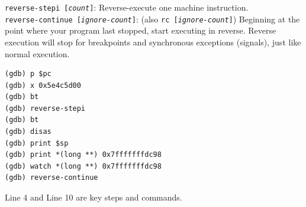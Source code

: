 \documentclass[a4paper]{article}
\begin{document}
\begin{itemize}
    \texttt{reverse-stepi [\textit{count}]}: Reverse-execute one machine instruction.\\
    \texttt{reverse-continue [\textit{ignore-count}]}: (also \texttt{rc [\textit{ignore-count}]}) Beginning at the point where your program last stopped, start executing in reverse. Reverse execution will stop for breakpoints and synchronous exceptions (signals), just like normal execution.
    \begin{verbatim}
(gdb) p $pc
(gdb) x 0x5e4c5d00
(gdb) bt
(gdb) reverse-stepi
(gdb) bt
(gdb) disas
(gdb) print $sp
(gdb) print *(long **) 0x7fffffffdc98
(gdb) watch *(long **) 0x7fffffffdc98
(gdb) reverse-continue
    \end{verbatim}
    Line 4 and Line 10 are key steps and commands.
\end{itemize}
\printbibliography
\end{document}
